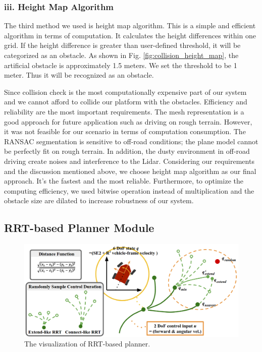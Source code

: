 \documentclass[../thesis.tex]{subfiles}
\begin{document}
\subsubsection{iii. Height Map Algorithm}
The third method we used is height map algorithm. This is a simple and efficient algorithm in terms of computation. It calculates the height differences within one grid. If the height difference is greater than user-defined threshold, it will be categorized as an obstacle. As shown in Fig. \ref{fig:collision_height_map}, the artificial obstacle is approximately 1.5 meters. We set the threshold to be 1 meter. Thus it will be recognized as an obstacle. 

Since collision check is the most computationally expensive part of our system and we cannot afford to collide our platform with the obstacles. Efficiency and reliability are the most important requirements. The mesh representation is a good approach for future application such as driving on rough terrain. However, it was not feasible for our scenario in terms of computation consumption. The RANSAC segmentation is sensitive to off-road conditions; the plane model cannot be perfectly fit on rough terrain. In addition, the dusty environment in off-road driving create noises and interference to the Lidar. Considering our requirements and the discussion mentioned above, we choose height map algorithm as our final approach. It’s the fastest and the most reliable. Furthermore, to optimize the computing efficiency, we used bitwise operation instead of multiplication and the obstacle size are dilated to increase robustness of our system. 

\subsection{RRT-based Planner Module}

\begin{figure}[t]
	\begin{center}
		\centerline{\includegraphics[width=0.8\columnwidth]{./RRTPlanner/fig/rrt.png}}
		\caption{The visualization of RRT-based planner.}
		\label{fig:rrt}
	\end{center}
\end{figure} 
\end{document}
